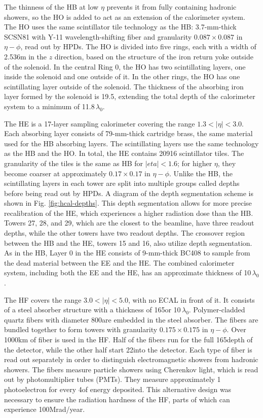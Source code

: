 The thinness of the HB at low $\eta$ prevents it from fully containing hadronic showers, so the HO is added to act as an extension of the calorimeter system. The HO uses the same scintillator tile technology as the HB: 3.7-mm-thick SCSN81 with Y-11 wavelength-shifting fiber and granularity $0.087\times0.087$ in $\eta-\phi$, read out by HPDs. The HO is divided into five rings, each with a width of 2.536\unit{m} in the $z$ direction, based on the structure of the iron return yoke outside of the solenoid. In the central Ring 0, the HO has two scintillating layers, one inside the solenoid and one outside of it. In the other rings, the HO has one scintillating layer outside of the solenoid. The thickness of the absorbing iron layer formed by the solenoid is 19.5\cm, extending the total depth of the calorimeter system to a minimum of 11.8$\,\lambda_{0}$.

The HE is a 17-layer sampling calorimeter covering the range $1.3<|\eta|<3.0$. Each absorbing layer consists of 79-mm-thick cartridge brass, the same material used for the HB absorbing layers. The scintillating layers use the same technology as the HB and the HO. In total, the HE contains 20916 scintillator tiles. The granularity of the tiles is the same as HB for $|eta|<1.6$; for higher $\eta$, they become coarser at approximately $0.17\times0.17$ in $\eta-\phi$. Unlike the HB, the scintillating layers in each tower are split into multiple groups called depths before being read out by HPDs. A diagram of the depth segmentation scheme is shown in Fig. \ref{fig:hcal-depths}. This depth segmentation allows for more precise recalibration of the HE, which experiences a higher radiation dose than the HB. Towers 27, 28, and 29, which are the closest to the beamline, have three readout depths, while the other towers have two readout depths. The crossover region between the HB and the HE, towers 15 and 16, also utilize depth segmentation. As in the HB, Layer 0 in the HE consists of 9-mm-thick BC408 to sample from the dead material between the EE and the HE. The combined calorimeter system, including both the EE and the HE, has an approximate thickness of 10$\,\lambda_{0}$.

The HF covers the range $3.0<|\eta|<5.0$, with no ECAL in front of it. It consists of a steel absorber structure with a thickness of 165\cm or 10$\,\lambda_{0}$. Polymer-cladded quartz fibers with diameter 800\mum are embedded in the steel absorber. The fibers are bundled together to form towers with granularity $0.175\times0.175$ in $\eta-\phi$. Over 1000\unit{km} of fiber is used in the HF. Half of the fibers run for the full 165\cm depth of the detector, while the other half start 22\cm into the detector. Each type of fiber is read out separately in order to distinguish electromagnetic showers from hadronic showers. The fibers measure particle showers using Cherenkov light, which is read out by photomultiplier tubes (PMTs). They measure approximately 1 photoelectron for every 4\GeV of energy deposited. This alternative design was necessary to ensure the radiation hardness of the HF, parts of which can experience 100\unit{Mrad/year}.

